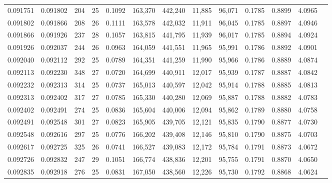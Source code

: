 \begin{tabular}{rrrrrrrrrrrrr}
0.091751 & 0.091802 & 204 &  25 &                                     0.1092 & 163,370 & 442,240 &  11,885 &  96,071 & 0.1785 & 0.8899 & 4.0965 \\
0.091802 & 0.091866 & 208 &  26 &                                     0.1111 & 163,578 & 442,032 &  11,911 &  96,045 & 0.1785 & 0.8897 & 4.0946 \\
0.091866 & 0.091926 & 237 &  28 &                                     0.1057 & 163,815 & 441,795 &  11,939 &  96,017 & 0.1785 & 0.8894 & 4.0924 \\
0.091926 & 0.092037 & 244 &  26 &                                     0.0963 & 164,059 & 441,551 &  11,965 &  95,991 & 0.1786 & 0.8892 & 4.0901 \\
0.092040 & 0.092112 & 292 &  25 &                                     0.0789 & 164,351 & 441,259 &  11,990 &  95,966 & 0.1786 & 0.8889 & 4.0874 \\
0.092113 & 0.092230 & 348 &  27 &                                     0.0720 & 164,699 & 440,911 &  12,017 &  95,939 & 0.1787 & 0.8887 & 4.0842 \\
0.092232 & 0.092313 & 314 &  25 &                                     0.0737 & 165,013 & 440,597 &  12,042 &  95,914 & 0.1788 & 0.8885 & 4.0813 \\
0.092313 & 0.092402 & 317 &  27 &                                     0.0785 & 165,330 & 440,280 &  12,069 &  95,887 & 0.1788 & 0.8882 & 4.0783 \\
0.092402 & 0.092491 & 274 &  25 &                                     0.0836 & 165,604 & 440,006 &  12,094 &  95,862 & 0.1789 & 0.8880 & 4.0758 \\
0.092491 & 0.092548 & 301 &  27 &                                     0.0823 & 165,905 & 439,705 &  12,121 &  95,835 & 0.1790 & 0.8877 & 4.0730 \\
0.092548 & 0.092616 & 297 &  25 &                                     0.0776 & 166,202 & 439,408 &  12,146 &  95,810 & 0.1790 & 0.8875 & 4.0703 \\
0.092617 & 0.092725 & 325 &  26 &                                     0.0741 & 166,527 & 439,083 &  12,172 &  95,784 & 0.1791 & 0.8873 & 4.0672 \\
0.092726 & 0.092832 & 247 &  29 &                                     0.1051 & 166,774 & 438,836 &  12,201 &  95,755 & 0.1791 & 0.8870 & 4.0650 \\
0.092835 & 0.092918 & 276 &  25 &                                     0.0831 & 167,050 & 438,560 &  12,226 &  95,730 & 0.1792 & 0.8868 & 4.0624 \\

\end{tabular}
